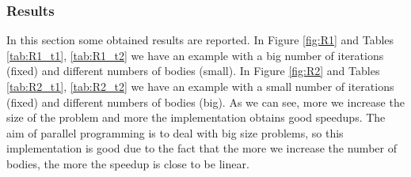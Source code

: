 \documentclass[a4paper]{article}
\begin{document}
\subsubsection{Results}
\label{sec:res}
In this section some obtained results are reported. In Figure \ref{fig:R1} and Tables \ref{tab:R1_t1}, \ref{tab:R1_t2} we have an example with a big number of iterations (fixed) and different numbers of bodies (small). In Figure \ref{fig:R2} and Tables \ref{tab:R2_t1}, \ref{tab:R2_t2} we have an example with a small number of iterations (fixed) and different numbers of bodies (big). As we can see, more we increase the size of the problem and more the implementation obtains good speedups. The aim of parallel programming is to deal with big size problems, so this implementation is good due to the fact that the more we increase the number of bodies, the more the speedup is close to be linear. \\
\end{document}
